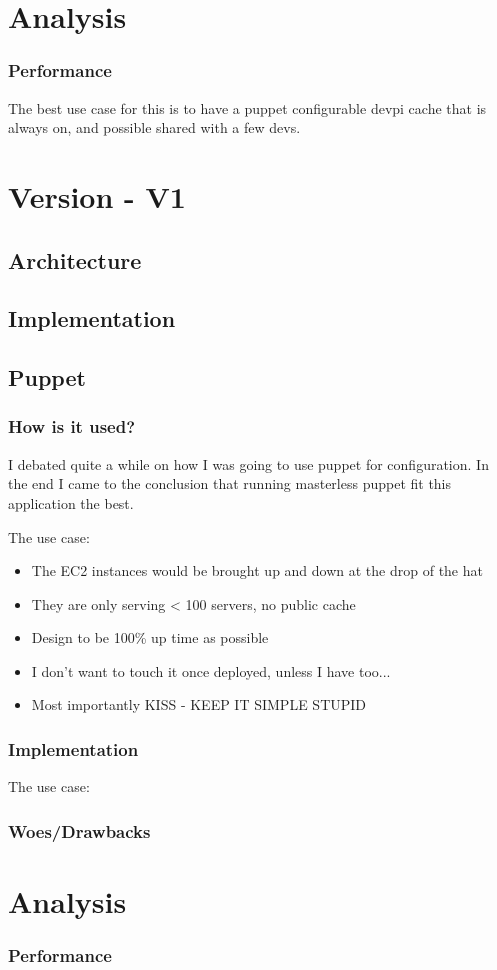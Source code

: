 \documentclass{article}
\begin{document}
\section{Analysis}
\subsubsection{Performance}
The best use case for this is to have a puppet configurable devpi cache that is always on, and possible shared with a few devs. 

\section{Version - V1}

\subsection{Architecture}

\subsection{Implementation}

\subsection{Puppet}
\subsubsection{How is it used?}
I debated quite a while on how I was going to use puppet for configuration. In the end I came to the conclusion that
running masterless puppet fit this application the best.  

The use case:
\begin{itemize}
    \item The EC2 instances would be brought up and down at the drop of the hat
    \item They are only serving < 100 servers, no public cache
    \item Design to be 100\% up time as possible 
    \item I don't want to touch it once deployed, unless I have too... 
    \item Most importantly KISS - KEEP IT SIMPLE STUPID
\end{itemize}

\subsubsection{Implementation}
The use case:

\subsubsection{Woes/Drawbacks}

\section{Analysis}
\subsubsection{Performance}
\end{document}
